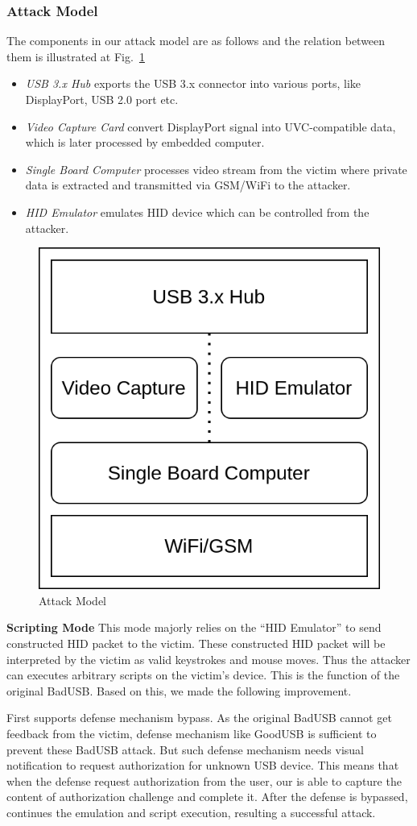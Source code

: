 \subsubsection{Attack Model}
The components in our attack model are as follows and the relation between them is illustrated at Fig.~\ref{fig:attack_model}
\begin{itemize}
	\item\textit{USB 3.x Hub} exports the USB 3.x connector into various ports, like DisplayPort, USB 2.0 port etc.
	\item\textit{Video Capture Card} convert DisplayPort signal into UVC-compatible data, which is later processed by embedded computer.
	\item\textit{Single Board Computer} processes video stream from the victim where private data is extracted and transmitted via GSM/WiFi to the attacker.
	\item\textit{HID Emulator} emulates HID device which can be controlled from the attacker.
\end{itemize}
\begin{figure}[t]
	\centering
	\includegraphics[width=0.56\linewidth]{./Figs/attack_model.png}
	\caption{Attack Model}
	\label{fig:attack_model}
\end{figure}
\textbf{Scripting Mode} This mode majorly relies on the ``HID Emulator'' to send constructed HID packet to the victim. These constructed HID packet will be interpreted by the victim as valid keystrokes and mouse moves. Thus the attacker can executes arbitrary scripts on the victim's device. This is the function of the original BadUSB. Based on this, we made the following improvement.

First \tool supports defense mechanism bypass. As the original BadUSB cannot get feedback from the victim, defense mechanism like GoodUSB \cite{tian2015defending} is sufficient to prevent these BadUSB attack. But such defense mechanism needs visual notification to request authorization for unknown USB device. This means that when the defense request authorization from the user, our \tool is able to capture the content of authorization challenge and complete it. After the defense is bypassed, \tool continues the emulation and script execution, resulting a successful attack.

